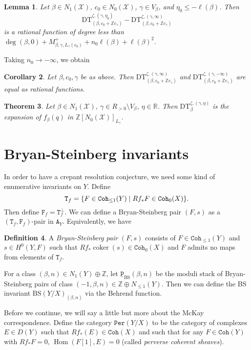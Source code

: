 \documentclass[leqno, openany]{memoir}
\newtheorem{thm}{Theorem}[section]
\newtheorem{cor}[thm]{Corollary}
\newtheorem{lem}[thm]{Lemma}
\theoremstyle{definition}
\newtheorem{defn}[thm]{Definition}
\theoremstyle{remark}
\theoremstyle{plain}
\theoremstyle{definition}
\theoremstyle{remark}
\newcommand{\R}{\mathbb{R}}
\newcommand{\Z}{\mathbb{Z}}
\newcommand{\mc}[1]{\mathcal{#1}}
\newcommand{\mr}[1]{\mathrm{#1}}
\newcommand{\mt}[1]{\mathtt{#1}}
\newcommand{\on}[1]{\operatorname{#1}}
\newcommand{\ul}[1]{\underline{#1}}
\DeclareMathOperator{\Hom}{Hom}
\begin{document}
\begin{lem}
    Let $\beta \in N_1(\mc{X})$, $c_0 \in N_0(\mc{X})$, $\gamma \in V_{\beta}$, and $\eta_0 \leq -\ell(\beta)$. Then
    \[ \mr{DT}_{(\beta, c_0 + \Z c_{\gamma})}^{\zeta, (\gamma, \eta_0)} - \mr{DT}_{(\beta, c_0 + \Z c_{\gamma})}^{\zeta, (\gamma, \infty)} \]
    is a rational function of degree less than $\deg(\beta, 0) + M_{\beta, \gamma, L_{\gamma}(c_0)}^+ + n_0 \ell(\beta) + \ell(\beta)^2$.
\end{lem}
Taking $n_0 \to -\infty$, we obtain
\begin{cor}
    Let $\beta, c_0, \gamma$ be as above. Then $\mr{DT}_{(\beta, c_0 + \Z c_{\gamma})}^{\zeta, (\gamma, \infty)}$ and $\mr{DT}_{(\beta, c_0 + \Z c_{\gamma})}^{\zeta, (\gamma, -\infty)}$ are equal as rational functions.
\end{cor}

\begin{thm}
    Let $\beta \in N_1(\mc{X})$, $\gamma \in R_{>0} \setminus V_{\beta}$, $\eta \in \R$. Then $\mr{DT}_{\beta}^{\zeta, (\gamma, \eta)}$ is the expansion of $f_{\beta}(q)$ in $\Z[N_0(\mc{X})]_{L_{\gamma}}$.
\end{thm}

\section{Bryan-Steinberg invariants}

In order to have a crepant resolution conjecture, we need some kind of enumerative invariants on $Y$. Define
\[ \mt{T}_f = \qty{F \in \mt{Coh}_{\leq 1}(Y) \mid R f_* F \in \mt{Coh}_0(X)}. \]
Then define $\mt{F}_f = \mt{T}_f^{\perp}$. We can define a Bryan-Steinberg pair $(F, s)$ as a $(\mt{T}_f, \mt{F}_f)$-pair in $\mt{A}_Y$. Equivalently, we have

\begin{defn}
    A \textit{Bryan-Steinberg pair} $(F, s)$ consists of $F \in \mt{Coh}_{\leq 1}(Y)$ and $s \in H^0(Y, F)$ such that $R f_* \on{coker}(s) \in \mt{Coh}_0(X)$ and $F$ admits no maps from elements of $\mt{T}_f$.
\end{defn}

For a class $(\beta, n) \in N_1(Y) \oplus \Z$, let $\mt{\ul{P}}_{\mr{BS}}(\beta, n)$ be the moduli stack of Bryan-Steinberg pairs of class $(-1, \beta, n) \in \Z \oplus N_{\leq 1}(Y)$. Then we can define the BS invariant $\mr{BS}(Y/X)_{(\beta, n)}$ via the Behrend function.

Before we continue, we will say a little but more about the McKay correspondence. Define the category $\mt{Per}(Y/X)$ to be the category of complexes $E \in D(Y)$ such that $R f_*(E) \in \mt{Coh}(X)$ and such that for any $F \in \mt{Coh}(Y)$ with $R f_* F = 0$, $\Hom(F[1], E) = 0$ (called \textit{perverse coherent sheaves}).
\end{document}
